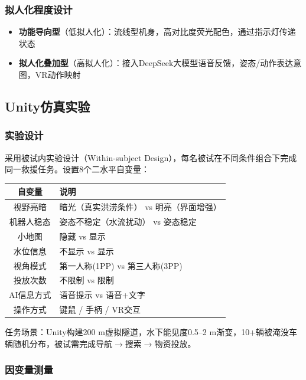 \documentclass[12pt,a4paper]{ctexart}
\begin{document}
\subsubsection{拟人化程度设计}

\begin{itemize}
    \item \textbf{功能导向型}（低拟人化）：流线型机身，高对比度荧光配色，通过指示灯传递状态
    \item \textbf{拟人化叠加型}（高拟人化）：接入DeepSeek大模型语音反馈，姿态/动作表达意图，VR动作映射
\end{itemize}

\subsection{Unity仿真实验}

\subsubsection{实验设计}

采用被试内实验设计（Within-subject Design），每名被试在不同条件组合下完成同一救援任务。设置8个二水平自变量：

\begin{center}
\begin{tabular}{cl}
\toprule
\textbf{自变量} & \textbf{说明} \\
\midrule
视野亮暗 & 暗光（真实洪涝条件） vs 明亮（界面增强） \\
机器人稳态 & 姿态不稳定（水流扰动） vs 姿态稳定 \\
小地图 & 隐藏 vs 显示 \\
水位信息 & 不显示 vs 显示 \\
视角模式 & 第一人称(1PP) vs 第三人称(3PP) \\
投放次数 & 不限制 vs 限制 \\
AI信息方式 & 语音提示 vs 语音+文字 \\
操作方式 & 键鼠 / 手柄 / VR交互 \\
\bottomrule
\end{tabular}
\end{center}

任务场景：Unity构建200 m虚拟隧道，水下能见度0.5--2 m渐变，10+辆被淹没车辆随机分布，被试需完成导航$\to$搜索$\to$物资投放。

\subsubsection{因变量测量}
\end{document}
